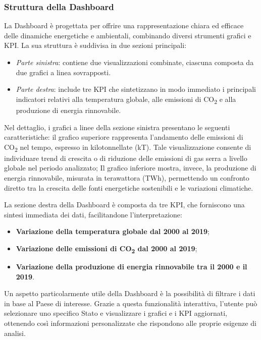 \subsubsection{Struttura della Dashboard}
La Dashboard è progettata per offrire una rappresentazione chiara ed efficace delle dinamiche energetiche e ambientali, combinando diversi strumenti grafici e KPI. La sua struttura è suddivisa in due sezioni principali:
\vspace{2mm}
\begin{itemize}
\item \textit{Parte sinistra}: contiene due visualizzazioni combinate, ciascuna composta da due grafici a linea sovrapposti.
\item \textit{Parte destra}: include tre KPI che sintetizzano in modo immediato i principali indicatori relativi alla temperatura globale, alle emissioni di CO\textsubscript{2} e alla produzione di energia rinnovabile.
\end{itemize}
\vspace{2mm}

Nel dettaglio, i grafici a linee della sezione sinistra presentano le seguenti caratteristiche:
il grafico superiore rappresenta l'andamento delle emissioni di CO\textsubscript{2} nel tempo, espresso in kilotonnellate (kT). Tale visualizzazione consente di individuare trend di crescita o di riduzione delle emissioni di gas serra a livello globale nel periodo analizzato;
Il grafico inferiore mostra, invece, la produzione di energia rinnovabile, misurata in terawattora (TWh), permettendo un confronto diretto tra la crescita delle fonti energetiche sostenibili e le variazioni climatiche.


La sezione destra della Dashboard è composta da tre KPI, che forniscono una sintesi immediata dei dati, facilitandone l'interpretazione:
\vspace{2mm}
\begin{itemize}
\item \textbf{Variazione della temperatura globale dal 2000 al 2019};
\item \textbf{Variazione delle emissioni di CO\textsubscript{2} dal 2000 al 2019};
\item \textbf{Variazione della produzione di energia rinnovabile tra il 2000 e il 2019}.
\end{itemize}
\vspace{2mm}

Un aspetto particolarmente utile della Dashboard è la possibilità di filtrare i dati in base al Paese di interesse. Grazie a questa funzionalità interattiva, l'utente può selezionare uno specifico Stato e visualizzare i grafici e i KPI aggiornati, ottenendo così informazioni personalizzate che rispondono alle proprie esigenze di analisi.

